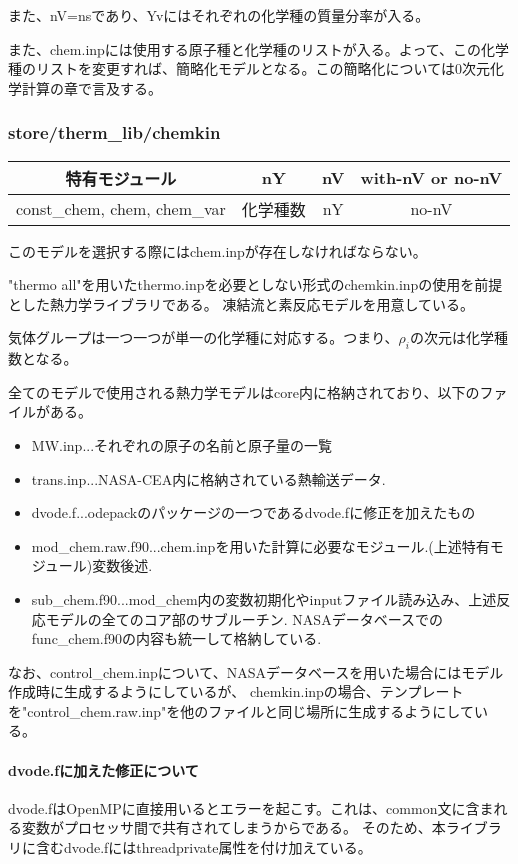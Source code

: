 \documentclass{jsarticle}
\begin{document}
また、nV=nsであり、Yvにはそれぞれの化学種の質量分率が入る。

また、chem.inpには使用する原子種と化学種のリストが入る。よって、この化学種のリストを変更すれば、簡略化モデルとなる。この簡略化については0次元化学計算の章で言及する。
\subsubsection{store/therm\_lib/chemkin}%
\begin{center}
\begin{tabular}{cccc}\hline
特有モジュール               &       nY & nV & with-nV or no-nV\\\hline \hline
const\_chem, chem, chem\_var & 化学種数 & nY & no-nV\\
\hline
\end{tabular}
\end{center}

このモデルを選択する際にはchem.inpが存在しなければならない。

"thermo all"を用いたthermo.inpを必要としない形式のchemkin.inpの使用を前提とした熱力学ライブラリである。
凍結流と素反応モデルを用意している。

気体グループは一つ一つが単一の化学種に対応する。つまり、$\rho _i$の次元は化学種数となる。

全てのモデルで使用される熱力学モデルはcore内に格納されており、以下のファイルがある。
\begin{itemize}
\item MW.inp...それぞれの原子の名前と原子量の一覧
\item trans.inp...NASA-CEA内に格納されている熱輸送データ.
\item dvode.f...odepackのパッケージの一つであるdvode.fに修正を加えたもの
\item mod\_chem.raw.f90...chem.inpを用いた計算に必要なモジュール.(上述特有モジュール)変数後述.
\item sub\_chem.f90...mod\_chem内の変数初期化やinputファイル読み込み、上述反応モデルの全てのコア部のサブルーチン.
NASAデータベースでのfunc\_chem.f90の内容も統一して格納している.
\end{itemize}

なお、control\_chem.inpについて、NASAデータベースを用いた場合にはモデル作成時に生成するようにしているが、
chemkin.inpの場合、テンプレートを"control\_chem.raw.inp"を他のファイルと同じ場所に生成するようにしている。

\paragraph{dvode.fに加えた修正について}%
dvode.fはOpenMPに直接用いるとエラーを起こす。これは、common文に含まれる変数がプロセッサ間で共有されてしまうからである。
そのため、本ライブラリに含むdvode.fにはthreadprivate属性を付け加えている。
\end{document}
